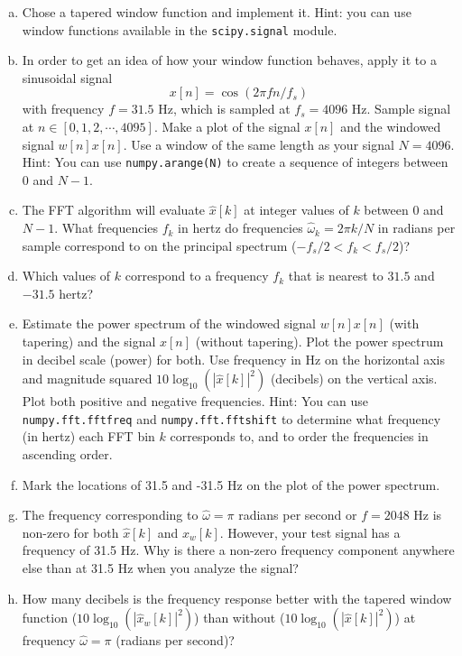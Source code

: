\begin{enumerate}[a)]
  \item Chose a tapered window function and implement it.
        Hint: you can use window functions available in the \verb|scipy.signal| module.

  \item In order to get an idea of how your window function behaves,
        apply it to a sinusoidal signal
        \begin{equation}
          x[n]=\cos(2\pi f  n/f_s)
        \end{equation}
        with frequency $f=31.5$ Hz, which is sampled at $f_s=4096$
        Hz. Sample signal at $n\in[0,1,2,\cdots,4095]$. Make a plot of the
        signal $x[n]$ and the windowed signal $w[n]x[n]$. Use a window of
        the same length as your signal $N=4096$. Hint: You can use \verb|numpy.arange(N)|
        to create a sequence of integers between $0$ and $N-1$.

  \item The FFT algorithm will evaluate $\hat{x}[k]$ at integer values of $k$ between $0$ and $N-1$.
        What frequencies $f_k$ in hertz do frequencies $\hat{\omega}_k = 2\pi k/N$ in radians per sample
        correspond to on the principal spectrum ($-f_s/2 < f_k < f_s/2$)?

  \item Which values of $k$ correspond to a frequency $f_k$ that is nearest to $31.5$ and $-31.5$ hertz?

  \item Estimate the power spectrum of the windowed signal $w[n]x[n]$ (with tapering) and the
        signal $x[n]$ (without tapering). Plot the power spectrum in decibel scale (power) for both.
        Use frequency in Hz on the horizontal axis and magnitude squared
        $10 \log_{10}(|\hat{x}[k]|^2)$ (decibels) on the vertical axis.  Plot both positive and
        negative frequencies. Hint: You can use \verb|numpy.fft.fftfreq| and \verb|numpy.fft.fftshift|
        to determine what frequency (in hertz) each FFT bin $k$ corresponds to, 
        and to order the frequencies in ascending order.

  \item Mark the locations of 31.5 and -31.5 Hz on the plot of the power spectrum.

  \item The frequency corresponding to $\hat{\omega}=\pi$ radians per
        second or $f=2048$ Hz is non-zero for both $\hat{x}[k]$ and $\hat{x}_w[k]$.
        However, your test signal has a frequency of 31.5 Hz. Why is there a non-zero frequency
        component anywhere else than at 31.5 Hz when you analyze the signal?

  \item How many decibels is the frequency response better with the
        tapered window function ($10\log_{10}(|\hat{x}_w[k]|^2)$) than without
        ($10\log_{10}(|\hat{x}[k]|^2)$) at frequency $\hat{\omega}=\pi$ (radians per
        second)?

\end{enumerate}


